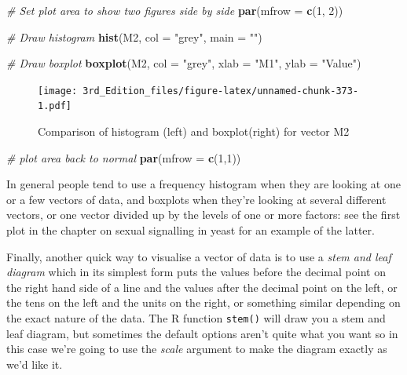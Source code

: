\documentclass[
]{book}
\newenvironment{Shaded}{\begin{snugshade}}{\end{snugshade}}
\newcommand{\CommentTok}[1]{\textcolor[rgb]{0.56,0.35,0.01}{\textit{#1}}}
\newcommand{\DataTypeTok}[1]{\textcolor[rgb]{0.13,0.29,0.53}{#1}}
\newcommand{\DecValTok}[1]{\textcolor[rgb]{0.00,0.00,0.81}{#1}}
\newcommand{\KeywordTok}[1]{\textcolor[rgb]{0.13,0.29,0.53}{\textbf{#1}}}
\newcommand{\NormalTok}[1]{#1}
\newcommand{\StringTok}[1]{\textcolor[rgb]{0.31,0.60,0.02}{#1}}
\begin{document}
\begin{Shaded}
\begin{Highlighting}[]
\CommentTok{# Set plot area to show two figures side by side}
\KeywordTok{par}\NormalTok{(}\DataTypeTok{mfrow =} \KeywordTok{c}\NormalTok{(}\DecValTok{1}\NormalTok{, }\DecValTok{2}\NormalTok{))}

\CommentTok{# Draw histogram}
\KeywordTok{hist}\NormalTok{(M2, }\DataTypeTok{col =} \StringTok{"grey"}\NormalTok{, }\DataTypeTok{main =} \StringTok{""}\NormalTok{)}

\CommentTok{# Draw boxplot}
\KeywordTok{boxplot}\NormalTok{(M2,}
        \DataTypeTok{col =} \StringTok{"grey"}\NormalTok{,}
        \DataTypeTok{xlab =} \StringTok{"M1"}\NormalTok{,}
        \DataTypeTok{ylab =} \StringTok{"Value"}\NormalTok{)}
\end{Highlighting}
\end{Shaded}

\begin{figure}
\centering
\texttt{[image: 3rd\_Edition\_files/figure-latex/unnamed-chunk-373-1.pdf]}
\caption{\label{fig:unnamed-chunk-373}Comparison of histogram (left) and boxplot(right) for vector M2}
\end{figure}

\begin{Shaded}
\begin{Highlighting}[]

\CommentTok{# plot area back to normal}
\KeywordTok{par}\NormalTok{(}\DataTypeTok{mfrow =} \KeywordTok{c}\NormalTok{(}\DecValTok{1}\NormalTok{,}\DecValTok{1}\NormalTok{))}
\end{Highlighting}
\end{Shaded}

In general people tend to use a frequency histogram when they are looking at one or a few vectors of data, and boxplots when they're looking at several different vectors, or one vector divided up by the levels of one or more factors: see the first plot in the chapter on sexual signalling in yeast for an example of the latter.

Finally, another quick way to visualise a vector of data is to use a \emph{stem and leaf diagram} which in its simplest form puts the values before the decimal point on the right hand side of a line and the values after the decimal point on the left, or the tens on the left and the units on the right, or something similar depending on the exact nature of the data. The R function \texttt{stem()} will draw you a stem and leaf diagram, but sometimes the default options aren't quite what you want so in this case we're going to use the \emph{scale} argument to make the diagram exactly as we'd like it.
\end{document}
